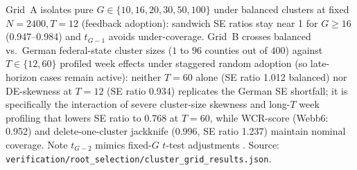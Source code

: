 \begin{table}[!t]
\par\smallskip\parbox{\linewidth}{\scriptsize Grid~A isolates pure $G \in \{10,16,20,30,50,100\}$ under balanced clusters at fixed $N=2400, T=12$ (feedback adoption): sandwich SE ratios stay near 1 for $G \ge 16$ (0.947--0.984) and $t_{G-1}$ avoids under-coverage. Grid~B crosses balanced vs.\ German federal-state cluster sizes ($1$ to $96$ counties out of $400$) against $T \in \{12, 60\}$ profiled week effects under staggered random adoption (so late-horizon cases remain active): neither $T=60$ alone (SE ratio 1.012 balanced) nor DE-skewness at $T=12$ (SE ratio 0.934) replicates the German SE shortfall; it is specifically the interaction of severe cluster-size skewness and long-$T$ week profiling that lowers SE ratio to 0.768 at $T=60$, while WCR-score (Webb6: 0.952) and delete-one-cluster jackknife (0.996, SE ratio 1.237) maintain nominal coverage. Note $t_{G-2}$ mimics fixed-$G$ $t$-test adjustments \citep{hwang2021simple}. Source: \texttt{verification/root\_selection/cluster\_grid\_results.json}.}
\end{table}
